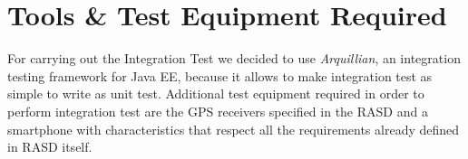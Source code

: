 \chapter{Tools \& Test Equipment Required} \label{chap4}
For carrying out the Integration Test we decided to use \textit{Arquillian}, an integration testing framework for Java EE, because it allows to make integration test as simple to write as unit test. Additional test equipment required in order to perform integration test are the GPS receivers specified in the RASD and a smartphone with characteristics that respect all the requirements already defined in RASD itself.